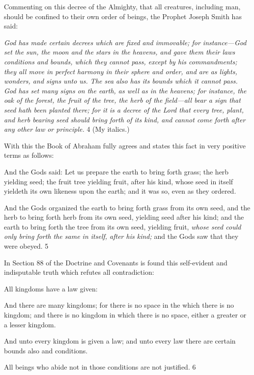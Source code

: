 Commenting on this decree of the Almighty, that all creatures, including man, should be
confined to their own order of beings, the Prophet Joseph Smith has said:

\textit{God has made certain decrees which are fixed and immovable; for instance—God set the
sun, the moon and the stars in the heavens, and gave them their laws conditions and bounds,
which they cannot pass, except by his commandments; they all move in perfect harmony in
their sphere and order, and are as lights, wonders, and signs unto us. The sea also has its
bounds which it cannot pass. God has set many signs on the earth, as well as in the heavens;
for instance, the oak of the forest, the fruit of the tree, the herb of the field—all bear a sign
that seed hath been planted there; for it is a decree of the Lord that every tree, plant, and
herb bearing seed should bring forth of its kind, and cannot come forth after any other law or
principle.} 4 (My italics.)

With this the Book of Abraham fully agrees and states this fact in very positive terms as
follows:

And the Gods said: Let us prepare the earth to bring forth grass; the herb yielding seed; the
fruit tree yielding fruit, after his kind, whose seed in itself yieldeth its own likeness upon the
earth; and it was so, even as they ordered.

And the Gods organized the earth to bring forth grass from its own seed, and the herb to
bring forth herb from its own seed, yielding seed after his kind; and the earth to bring forth
the tree from its own seed, yielding fruit, \textit{whose seed could only bring forth the same in itself,
after his kind;} and the Gods saw that they were obeyed. 5

In Section 88 of the Doctrine and Covenants is found this self-evident and indisputable truth
which refutes all contradiction:

All kingdoms have a law given:

And there are many kingdoms; for there is no space in the which there is no kingdom; and
there is no kingdom in which there is no space, either a greater or a lesser kingdom.

And unto every kingdom is given a law; and unto every law there are certain bounds also and
conditions.

All beings who abide not in those conditions are not justified. 6

